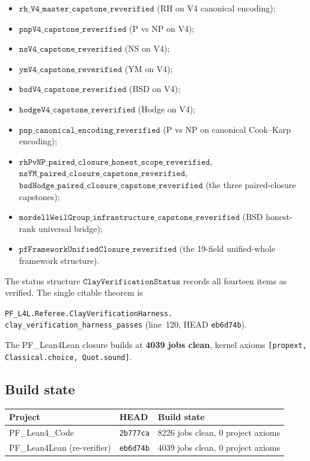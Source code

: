 \documentclass[11pt,a4paper]{article}
\theoremstyle{plain}
\theoremstyle{definition}
\begin{document}
\begin{itemize}[leftmargin=*,nosep]
\item $\mathtt{rh\_V4\_master\_capstone\_reverified}$
  (RH on V4 canonical encoding);
\item $\mathtt{pnpV4\_capstone\_reverified}$
  (P vs NP on V4);
\item $\mathtt{nsV4\_capstone\_reverified}$
  (NS on V4);
\item $\mathtt{ymV4\_capstone\_reverified}$
  (YM on V4);
\item $\mathtt{bsdV4\_capstone\_reverified}$
  (BSD on V4);
\item $\mathtt{hodgeV4\_capstone\_reverified}$
  (Hodge on V4);
\item $\mathtt{pnp\_canonical\_encoding\_reverified}$
  (P vs NP on canonical Cook--Karp encoding);
\item $\mathtt{rhPvNP\_paired\_closure\_honest\_scope\_reverified}$,
  $\mathtt{nsYM\_paired\_closure\_capstone\_reverified}$,
  $\mathtt{bsdHodge\_paired\_closure\_capstone\_reverified}$
  (the three paired-closure capstones);
\item $\mathtt{mordellWeilGroup\_infrastructure\_capstone\_reverified}$
  (BSD honest-rank universal bridge);
\item $\mathtt{pfFrameworkUnifiedClosure\_reverified}$
  (the 19-field unified-whole framework structure).
\end{itemize}

The status structure $\mathtt{ClayVerificationStatus}$ records all
fourteen items as verified. The single citable theorem is

\noindent\texttt{PF\_L4L.Referee.ClayVerificationHarness.\\
clay\_verification\_harness\_passes}
(line~120, HEAD \texttt{eb6d74b}).

\noindent The PF\_Lean4Lean closure builds at \textbf{4039 jobs
clean}, kernel axioms
\texttt{[propext, Classical.choice, Quot.sound]}.

\subsection{Build state}
\label{sec:build-state}

\begin{center}
\renewcommand{\arraystretch}{1.20}
\begin{tabular}{lll}
\toprule
\textbf{Project} & \textbf{HEAD} & \textbf{Build state} \\
\midrule
PF\_Lean4\_Code & \texttt{2b777ca} & 8226 jobs clean,
  0 project axioms \\
PF\_Lean4Lean (re-verifier) & \texttt{eb6d74b} & 4039 jobs clean,
  0 project axioms \\
\bottomrule
\end{tabular}
\end{center}
\end{document}
